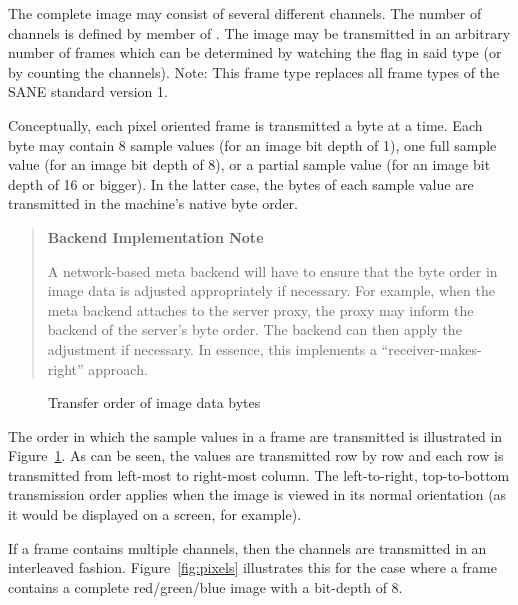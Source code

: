 \documentclass[11pt,DVIps]{report}
\begin{document}
\begin{changebar}
  The complete image may consist of several different channels. The number of channels
  is defined by member  of .
  The image may be transmitted in an arbitrary number of frames which can be
  determined by watching the  flag in said type (or by
  counting the channels).  Note: This frame type replaces all frame types of
  the SANE standard version 1.
\end{changebar}

Conceptually, each pixel oriented frame is transmitted a byte at a time.  Each
byte may contain 8 sample values (for an image bit depth of 1), one full
sample value (for an image bit depth of 8), or a partial sample value (for an
image bit depth of 16 or bigger).  In the latter case, the bytes of each
sample value are transmitted in the machine's native byte order.
\begin{quote}
  \begin{center}
    {\bf Backend Implementation Note}
  \end{center}
  A network-based meta backend will have to ensure that the byte order
  in image data is adjusted appropriately if necessary.  For example,
  when the meta backend attaches to the server proxy, the proxy may
  inform the backend of the server's byte order.  The backend can then
  apply the adjustment if necessary.  In essence, this implements a
  ``receiver-makes-right'' approach.
\end{quote}

\begin{figure}[htbp]
  \begin{center}
    \leavevmode
    \caption{Transfer order of image data bytes}
    \label{fig:xfer}
  \end{center}
\end{figure}

The order in which the sample values in a frame are transmitted is illustrated
in Figure~\ref{fig:xfer}.  As can be seen, the values are transmitted row by
row and each row is transmitted from left-most to right-most column.  The
left-to-right, top-to-bottom transmission order applies when the image is
viewed in its normal orientation (as it would be displayed on a screen, for
example).

If a frame contains multiple channels, then the channels are transmitted in an
interleaved fashion.  Figure~\ref{fig:pixels} illustrates this for the case
where a frame contains a complete red/green/blue image with a bit-depth of 8.
\end{document}
